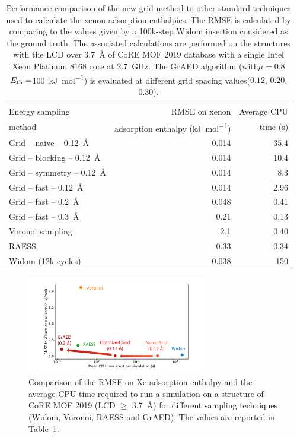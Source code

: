 \documentclass[main]{subfiles}
\begin{document}
\begin{table}[ht]
  \centering
  \setlength{\extrarowheight}{1pt}
  \begin{tabular}{|l|r|r|}
    \hline
    Energy sampling  & RMSE on xenon  &  Average CPU  \\
    method  & adsorption enthalpy (\si{\kilo\joule\per\mole}) &  time (s) \\[0.5mm]
    \hline
    Grid -- naive -- \SI{0.12}{\angstrom} & 0.014  &  35.4 \\[0.5mm] 
    Grid -- blocking -- \SI{0.12}{\angstrom} & 0.014  &  10.4 \\ 
    Grid -- symmetry -- \SI{0.12}{\angstrom} & 0.014  &  8.3 \\ 
    Grid -- fast -- \SI{0.12}{\angstrom} & 0.014  &  2.96 \\
    Grid -- fast -- \SI{0.2}{\angstrom} & 0.048  &  0.41 \\
    Grid -- fast -- \SI{0.3}{\angstrom} & 0.21  &  0.13 \\
    Voronoi sampling &   2.1  & 0.40 \\
    RAESS\autocite{Ren_2023} & 0.33   &  0.34 \\
    Widom\autocite{Widom1963} (12k cycles) & 0.038  &  150 \\
    \hline
  \end{tabular}
  \caption{Performance comparison of the new grid method to other standard techniques used to calculate the xenon adsorption enthalpies. The RMSE is calculated by comparing to the values given by a 100k-step Widom insertion considered as the ground truth. The associated calculations are performed on the structures with the LCD over \SI{3.7}{\angstrom} of CoRE MOF 2019 database with a single Intel Xeon Platinum 8168 core at 2.7~GHz. The GrAED algorithm (with$\mu=0.8$ $E_{\text{th}}=$\SI{100}{\kilo\joule\per\mole}) is evaluated at different grid spacing  values($0.12$, $0.20$, $0.30$).}\label{tab:grid}
\end{table}


\begin{figure}[ht]
  \centering
    \includegraphics[width=0.7\textwidth]{figures/3-fastsim/Grid_sumup.pdf}
    \caption{Comparison of the RMSE on Xe adsorption enthalpy and the average CPU time required to run a simulation on a structure of CoRE MOF 2019 (LCD $\geq$ \SI{3.7}{\angstrom}) for different sampling techniques (Widom, Voronoi, RAESS and GrAED). The values are reported in Table~\ref{tab:grid}. }\label{fgr:grid_perfomance}
\end{figure}
\end{document}
